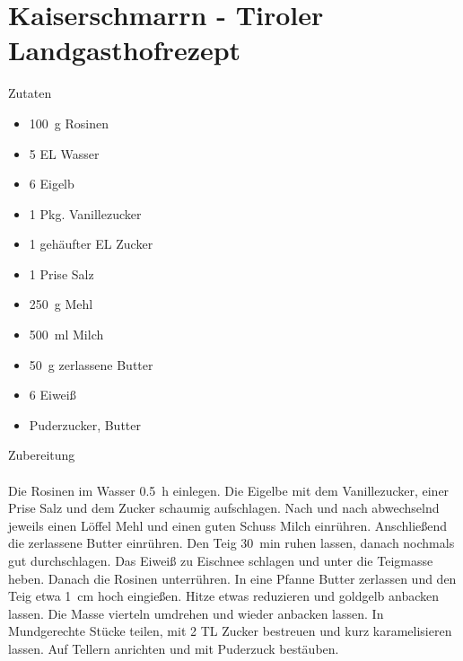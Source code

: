 \section*{Kaiserschmarrn - Tiroler Landgasthofrezept}
\ihead{}\ohead{}
\cfoot{}
{\Large Zutaten}
\begin{multicols}{2}
\begin{itemize}
    \item \SI{100}{g} Rosinen
    \item \num{5} EL Wasser
    \item \num{6} Eigelb
    \item \num{1} Pkg. Vanillezucker
    \item \num{1} gehäufter EL Zucker
    \item \num{1} Prise Salz
    \item \SI{250}{g} Mehl
    \item \SI{500}{ml} Milch
    \item \SI{50}{g} zerlassene Butter
    \item \num{6} Eiweiß
    \item Puderzucker, Butter
\end{itemize}
\end{multicols}
\noindent
{\Large Zubereitung}\\
\\
Die Rosinen im Wasser \SI{0.5}{h} einlegen. 
Die Eigelbe mit dem Vanillezucker, einer Prise Salz und dem Zucker schaumig aufschlagen.
Nach und nach abwechselnd jeweils einen Löffel Mehl und einen guten Schuss Milch einrühren.
Anschließend die zerlassene Butter einrühren. 
Den Teig \SI{30}{min} ruhen lassen, danach nochmals gut durchschlagen. 
Das Eiweiß zu Eischnee schlagen und unter die Teigmasse heben.
Danach die Rosinen unterrühren. 
In eine Pfanne Butter zerlassen und den Teig etwa \SI{1}{cm} hoch eingießen. 
Hitze etwas reduzieren und goldgelb anbacken lassen. 
Die Masse vierteln umdrehen und wieder anbacken lassen.
In Mundgerechte Stücke teilen, mit \num{2} TL Zucker bestreuen und kurz karamelisieren lassen. 
Auf Tellern anrichten und mit Puderzuck bestäuben. 
